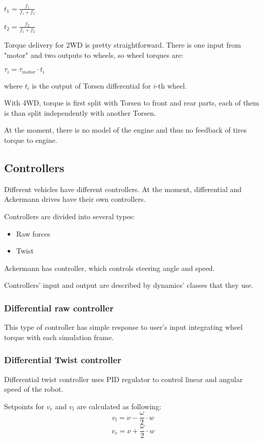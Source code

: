 \documentclass[a4paper,11pt]{article}
\begin{document}
$
t_1 = \frac{f_1}{f_1 + f_2}
$

$
t_2 = \frac{f_2}{f_1 + f_2}
$

Torque delivery for 2WD is pretty straightforward. There is one input from "motor" and two outputs to wheels, so wheel torques are:

$
\tau_i = \tau_{motor} \cdot t_i
$

where $t_i$ is the output of Torsen differential for $i$-th wheel.

With 4WD, torque is first split with Torsen to front and rear parts, each of them is than split independently with another Torsen.

At the moment, there is no model of the engine and thus no feedback of tires torque to engine. 


\subsection{Controllers}

Different vehicles have different controllers. 
At the moment, differential and Ackermann drives have their own controllers. 

Controllers are divided into several types: 
\begin{itemize}
\item Raw forces
\item Twist
\end{itemize}

Ackermann has controller, which controls steering angle and speed. 

Controllers' input and output are described by dynamics' classes that they use. 

\subsubsection{Differential raw controller}

This type of controller has simple response to user's input integrating wheel torque with each simulation frame.

\subsubsection{Differential Twist controller}

Differential twist controller uses PID regulator to control linear and angular speed of the robot. 

Setpoints for $v_r$ and $v_l$ are calculated as following:
\[
v_l = \nu - \frac{\omega}{2} \cdot w
\]
\[
v_r = \nu + \frac{\omega}{2} \cdot w
\]
\end{document}
